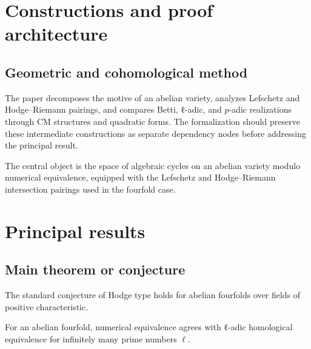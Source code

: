 \chapter{Constructions and proof architecture}
\label{chap:standard-conjectures-abelian-fourfolds-method}

\section{Geometric and cohomological method}
\label{sec:standard-conjectures-abelian-fourfolds-method}

The paper decomposes the motive of an abelian variety, analyzes Lefschetz and Hodge--Riemann pairings, and compares Betti, ℓ-adic, and $p$-adic realizations through CM structures and quadratic forms. The formalization should preserve these intermediate constructions
as separate dependency nodes before addressing the principal result.

\begin{definition}
\label{standard-conjectures-abelian-fourfolds-central-object}
The central object is the space of algebraic cycles on an abelian variety modulo numerical equivalence, equipped with the Lefschetz and Hodge--Riemann intersection pairings used in the fourfold case.
\notready
\end{definition}

\chapter{Principal results}
\label{chap:standard-conjectures-abelian-fourfolds-results}

\section{Main theorem or conjecture}
\label{sec:standard-conjectures-abelian-fourfolds-results}

\begin{theorem}
\label{standard-conjectures-abelian-fourfolds-main}
The standard conjecture of Hodge type holds for abelian fourfolds over fields of positive characteristic.
\notready
\end{theorem}

\begin{theorem}
\label{standard-conjectures-abelian-fourfolds-secondary}
For an abelian fourfold, numerical equivalence agrees with ℓ-adic homological equivalence for infinitely many prime numbers \(\ell\).
\notready
\end{theorem}
